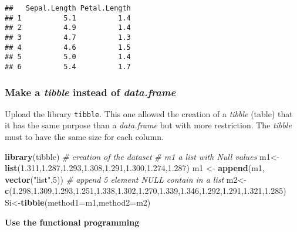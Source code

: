 \documentclass[
]{article}
\newenvironment{Shaded}{\begin{snugshade}}{\end{snugshade}}
\newcommand{\AttributeTok}[1]{\textcolor[rgb]{0.13,0.29,0.53}{#1}}
\newcommand{\CommentTok}[1]{\textcolor[rgb]{0.56,0.35,0.01}{\textit{#1}}}
\newcommand{\DecValTok}[1]{\textcolor[rgb]{0.00,0.00,0.81}{#1}}
\newcommand{\FloatTok}[1]{\textcolor[rgb]{0.00,0.00,0.81}{#1}}
\newcommand{\FunctionTok}[1]{\textcolor[rgb]{0.13,0.29,0.53}{\textbf{#1}}}
\newcommand{\NormalTok}[1]{#1}
\newcommand{\OtherTok}[1]{\textcolor[rgb]{0.56,0.35,0.01}{#1}}
\newcommand{\StringTok}[1]{\textcolor[rgb]{0.31,0.60,0.02}{#1}}
\begin{document}
\begin{verbatim}
##   Sepal.Length Petal.Length
## 1          5.1          1.4
## 2          4.9          1.4
## 3          4.7          1.3
## 4          4.6          1.5
## 5          5.0          1.4
## 6          5.4          1.7
\end{verbatim}

\hypertarget{make-a-tibble-instead-of-data.frame}{%
\subsubsection{\texorpdfstring{Make a \emph{tibble} instead of
\emph{data.frame}}{Make a tibble instead of data.frame}}\label{make-a-tibble-instead-of-data.frame}}

Upload the library \texttt{tibble}. This one allowed the creation of a
\emph{tibble} (table) that it has the same purpose than a
\emph{data.frame} but with more restriction. The \emph{tibble} must to
have the same size for each column.

\begin{Shaded}
\begin{Highlighting}[]
\FunctionTok{library}\NormalTok{(tibble)}
\CommentTok{\# creation of the dataset}
\CommentTok{\# m1 a list with Null values}
\NormalTok{m1}\OtherTok{\textless{}{-}}\FunctionTok{list}\NormalTok{(}\FloatTok{1.311}\NormalTok{,}\FloatTok{1.287}\NormalTok{,}\FloatTok{1.293}\NormalTok{,}\FloatTok{1.308}\NormalTok{,}\FloatTok{1.291}\NormalTok{,}\FloatTok{1.300}\NormalTok{,}\FloatTok{1.274}\NormalTok{,}\FloatTok{1.287}\NormalTok{)}
\NormalTok{m1 }\OtherTok{\textless{}{-}} \FunctionTok{append}\NormalTok{(m1, }\FunctionTok{vector}\NormalTok{(}\StringTok{"list"}\NormalTok{,}\DecValTok{5}\NormalTok{)) }\CommentTok{\# append 5 element NULL contain in a list}
\NormalTok{m2}\OtherTok{\textless{}{-}}\FunctionTok{c}\NormalTok{(}\FloatTok{1.298}\NormalTok{,}\FloatTok{1.309}\NormalTok{,}\FloatTok{1.293}\NormalTok{,}\FloatTok{1.251}\NormalTok{,}\FloatTok{1.338}\NormalTok{,}\FloatTok{1.302}\NormalTok{,}\FloatTok{1.270}\NormalTok{,}\FloatTok{1.339}\NormalTok{,}\FloatTok{1.346}\NormalTok{,}\FloatTok{1.292}\NormalTok{,}\FloatTok{1.291}\NormalTok{,}\FloatTok{1.321}\NormalTok{,}\FloatTok{1.285}\NormalTok{)}
\NormalTok{Si}\OtherTok{\textless{}{-}}\FunctionTok{tibble}\NormalTok{(}\AttributeTok{method1=}\NormalTok{m1,}\AttributeTok{method2=}\NormalTok{m2)}
\end{Highlighting}
\end{Shaded}

\textbf{Use the functional programming}
\end{document}
